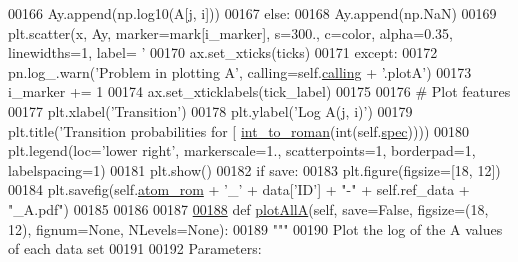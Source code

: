 \begin{DoxyCode}
00166                             Ay.append(np.log10(A[j, i]))
00167                         \textcolor{keywordflow}{else}:
00168                             Ay.append(np.NaN)
00169                 plt.scatter(x, Ay, marker=mark[i\_marker], s=300., c=color, alpha=0.35, linewidths=1, label=\textcolor{stringliteral}{
      '%
00170                 ax.set\_xticks(ticks)
00171             \textcolor{keywordflow}{except}:
00172                 pn.log\_.warn(\textcolor{stringliteral}{'Problem in plotting A'}, calling=self.\hyperlink{classpyneb_1_1plot_1_1plot_atomic_data_1_1_data_plot_a393a133b607541c57d5ebc5a34687e3f}{calling} + \textcolor{stringliteral}{'.plotA'})
00173             i\_marker += 1
00174         ax.set\_xticklabels(tick\_label)
00175 
00176         \textcolor{comment}{# Plot features}
00177         plt.xlabel(\textcolor{stringliteral}{'Transition'})
00178         plt.ylabel(\textcolor{stringliteral}{'Log A(j, i)'})
00179         plt.title(\textcolor{stringliteral}{'Transition probabilities for [%
      \hyperlink{namespacepyneb_1_1utils_1_1misc_aec4e973d4cb9299f749ef190ea636a06}{int\_to\_roman}(int(self.\hyperlink{classpyneb_1_1plot_1_1plot_atomic_data_1_1_data_plot_acaaca83a6e12e99ebc1da72af5f8c60a}{spec}))))
00180         plt.legend(loc=\textcolor{stringliteral}{'lower right'}, markerscale=1., scatterpoints=1, borderpad=1, labelspacing=1)
00181         plt.show()      
00182         \textcolor{keywordflow}{if} save:
00183             plt.figure(figsize=[18, 12])
00184             plt.savefig(self.\hyperlink{classpyneb_1_1plot_1_1plot_atomic_data_1_1_data_plot_a334c448311ed9dc8cd700af504e06254}{atom\_rom} + \textcolor{stringliteral}{'\_'} + data[\textcolor{stringliteral}{'ID'}] + \textcolor{stringliteral}{"-"} + self.ref\_data + \textcolor{stringliteral}{"\_A.pdf"})
00185 
00186 
00187 
\hypertarget{plot_atomic_data_8py_source_l00188}{}\hyperlink{classpyneb_1_1plot_1_1plot_atomic_data_1_1_data_plot_a0b245c7f8b97681b15beadcef38a0021}{00188}     \textcolor{keyword}{def }\hyperlink{classpyneb_1_1plot_1_1plot_atomic_data_1_1_data_plot_a0b245c7f8b97681b15beadcef38a0021}{plotAllA}(self, save=False, figsize=(18, 12), fignum=\textcolor{keywordtype}{None}, NLevels=\textcolor{keywordtype}{None}):
00189         \textcolor{stringliteral}{"""}
00190 \textcolor{stringliteral}{        Plot the log of the A values of each data set }
00191 \textcolor{stringliteral}{        }
00192 \textcolor{stringliteral}{        Parameters:}
}}
\end{DoxyCode}
